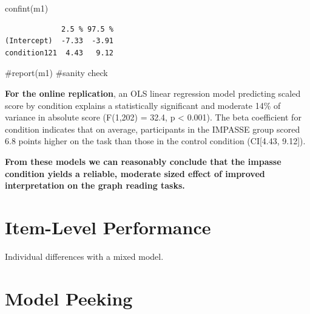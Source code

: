 \documentclass[
  letterpaper,
  DIV=11,
  numbers=noendperiod]{scrreprt}
\newenvironment{Shaded}{\begin{snugshade}}{\end{snugshade}}
\newcommand{\CommentTok}[1]{\textcolor[rgb]{0.37,0.37,0.37}{#1}}
\newcommand{\FunctionTok}[1]{\textcolor[rgb]{0.28,0.35,0.67}{#1}}
\newcommand{\NormalTok}[1]{\textcolor[rgb]{0.00,0.23,0.31}{#1}}
\begin{document}
\begin{Shaded}
\begin{Highlighting}[]
\FunctionTok{confint}\NormalTok{(m1)}
\end{Highlighting}
\end{Shaded}

\begin{verbatim}
             2.5 % 97.5 %
(Intercept)  -7.33  -3.91
condition121  4.43   9.12
\end{verbatim}

\begin{Shaded}
\begin{Highlighting}[]
\CommentTok{\#report(m1) \#sanity check}
\end{Highlighting}
\end{Shaded}

\textbf{For the online replication}, an OLS linear regression model
predicting scaled score by condition explains a statistically
significant and moderate 14\% of variance in absolute score (F(1,202) =
32.4, p \textless{} 0.001). The beta coefficient for condition indicates
that on average, participants in the IMPASSE group scored 6.8 points
higher on the task than those in the control condition (CI{[}4.43,
9.12{]}).

\begin{tcolorbox}[standard jigsaw,colframe=quarto-callout-note-color-frame, arc=.35mm, titlerule=0mm, toptitle=1mm, bottomtitle=1mm, rightrule=.15mm, title=\textcolor{quarto-callout-note-color}{\faInfo}\hspace{0.5em}{Note}, leftrule=.75mm, toprule=.15mm, bottomrule=.15mm, opacityback=0, colbacktitle=quarto-callout-note-color!10!white, left=2mm, opacitybacktitle=0.6, coltitle=black, colback=white]
\textbf{From these models we can reasonably conclude that the impasse
condition yields a reliable, moderate sized effect of improved
interpretation on the graph reading tasks.}
\end{tcolorbox}

\hypertarget{item-level-performance}{%
\section{Item-Level Performance}\label{item-level-performance}}

Individual differences with a mixed model.

\hypertarget{model-peeking}{%
\section{Model Peeking}\label{model-peeking}}
\end{document}
